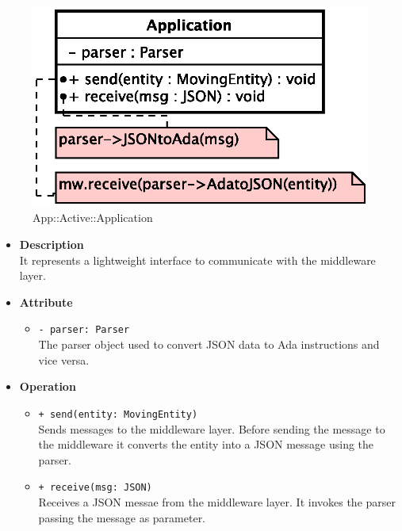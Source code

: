 \begin{figure}[h]
\centering
\includegraphics[scale=0.6,keepaspectratio]{images/solution/application.eps}
\caption{App::Active::Application}
\label{fig:sd-app-application}
\end{figure}
\FloatBarrier
\begin{itemize}
  \item \textbf{Description} \\
    It represents a lightweight interface to communicate with the middleware layer.
  \item \textbf{Attribute}
  \begin{itemize}
    \item \texttt{- parser: Parser} \\
The parser object used to convert JSON data to Ada instructions and vice versa.
  \end{itemize}
  \item \textbf{Operation}
  \begin{itemize} 
    \item \texttt{+ send(entity: MovingEntity)} \\
Sends messages to the middleware layer. Before sending the message to the
middleware it converts the entity into a JSON message using the parser.
    \item \texttt{+ receive(msg: JSON)} \\
Receives a JSON messae from the middleware layer. It invokes the parser 
passing the message as parameter.
  \end{itemize}
\end{itemize}
